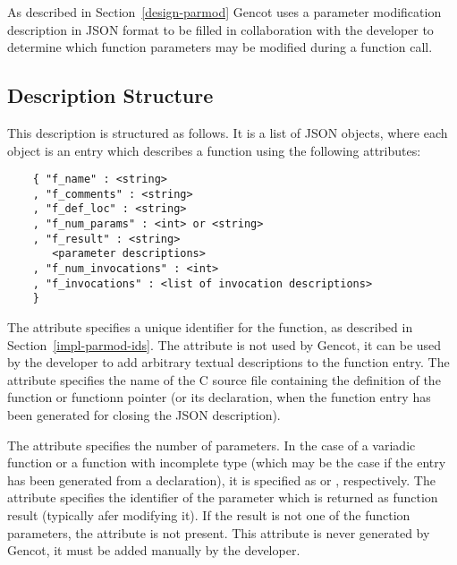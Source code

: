 As described in Section~\ref{design-parmod} Gencot uses a parameter modification description in JSON format 
to be filled in collaboration with the developer to determine which function parameters may be modified during
a function call. 

\subsection{Description Structure}
\label{impl-parmod-struct}

This
description is structured as follows. It is a list of JSON objects, where each object is an entry which describes a function using
the following attributes:
\begin{verbatim}
    { "f_name" : <string>
    , "f_comments" : <string>
    , "f_def_loc" : <string>
    , "f_num_params" : <int> or <string>
    , "f_result" : <string>
       <parameter descriptions>
    , "f_num_invocations" : <int>
    , "f_invocations" : <list of invocation descriptions>
    }
\end{verbatim}

The attribute  specifies a unique identifier for the function, as described in Section~\ref{impl-parmod-ids}.
The attribute  is not used by Gencot, it can be used by the developer to add arbitrary textual
descriptions to the function entry. The attribute  specifies the name of the C source file containing
the definition of the function or functionn pointer (or its declaration, when the function entry has been 
generated for closing the JSON description). 

The attribute  specifies the number of parameters. In the case of a variadic function or a function
with incomplete type (which may be the case if the entry has been generated from a declaration), it is specified
as  or , respectively. The attribute  specifies the identifier of
the parameter which is returned as function result (typically afer modifying it). If the result is not one of the 
function parameters, the attribute is not present. This attribute is never generated by Gencot, it must be added manually
by the developer. 

